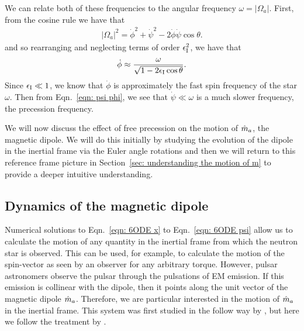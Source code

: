 \documentclass[../full_thesis/full_thesis.tex]{subfiles}
\begin{document}
We can relate both of these frequencies to the angular frequency $\omega = |\Omega_a|$.
First, from the cosine rule we have that
\begin{align}
|\Omega_a|^{2} = \dot{\phi}^{2}+\dot{\psi}^{2} - 2\dot{\phi}\dot{\psi}\cos\theta.
\end{align}
and so rearranging and neglecting terms of order $\epsilon_{\mathrm{I}}^{2}$, we have that
\begin{align}
\dot{\phi} \approx \frac{\omega}{\sqrt{1- 2\epsilon_{\mathrm{I}}\cos\theta}}.
\label{eqn: phi dot}
\end{align}
Since $\epsilon_{\mathrm{I}} \ll 1$, we know that $\dot{\phi}$ is approximately the fast spin frequency
of the star $\omega$. Then from Eqn.~\eqref{eqn: psi phi}, we see that $\dot{\psi} \ll \omega$
is a much slower frequency, the precession frequency.


We will now discuss the effect of free precession on the motion of $\hat{m}_a$, the
magnetic dipole. We will do this initially by studying the evolution of the
dipole in the inertial frame via the Euler angle rotations and then we will
return to this reference frame picture in Section~\ref{sec: understanding the
motion of m} to provide a deeper intuitive understanding.

\subsection{Dynamics of the magnetic dipole}

Numerical solutions to Eqn.~\eqref{eqn: 6ODE x} to Eqn.~\eqref{eqn: 6ODE psi}
allow us to calculate the motion of any quantity in the inertial frame from
which the neutron star is observed.  This can be used, for example, to
calculate the motion of the spin-vector as seen by an observer for any
arbitrary torque. However, pulsar astronomers observe the pulsar through the
pulsations of EM emission. If this emission is collinear with the dipole, then
it points along the unit vector of the magnetic dipole $\hat{m}_a$. Therefore, we
are particular interested in the motion of $\hat{m}_a$ in the inertial frame. This
system was first studied in the follow way by \citet{bisnovatyi1990model}, but
here we follow the treatment by \citet{Jones2001}.
\end{document}
